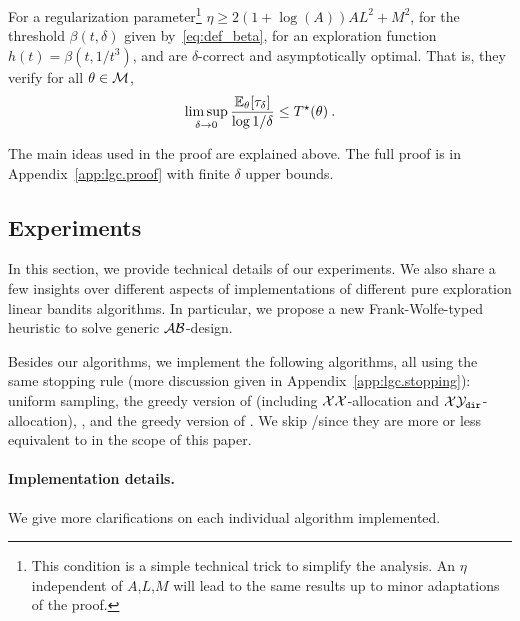 \begin{theorem}\label{thm:sample_complexity}
For a regularization parameter\footnote{This condition is a simple technical trick to simplify the analysis. An $\eta$ independent of $A$,$L$,$M$ will lead to the same results up to minor adaptations of the proof.} $\eta \geq 2(1+\log(A))AL^2+M^2$, for the threshold $\beta(t,\delta)$ given by~\eqref{eq:def_beta}, for an exploration function $h(t)=\beta(t,1/t^3)$, \LG and \LGC are $\delta$-correct and asymptotically optimal. That is, they verify for all $\theta\in \mathcal{M}$,
\begin{align*}
\limsup_{\delta\to 0}\frac{\mathbb{E}_\theta[\tau_\delta]}{ \log 1/\delta} \le T^{\star}(\theta) \: .
\end{align*}
\end{theorem}
The main ideas used in the proof are explained above. The full proof is in Appendix~\ref{app:lgc.proof} with finite $\delta$ upper bounds.

\subsection{Experiments}\label{sec:lgc.game.experiments}

In this section, we provide technical details of our experiments. We also share a few insights over different aspects of implementations of different pure exploration linear bandits algorithms. In particular, we propose a new Frank-Wolfe-typed heuristic to solve generic $\mathcal{A}\mathcal{B}$-design.

Besides our algorithms, we implement the following algorithms, all using the same stopping rule (more discussion given in Appendix~\ref{app:lgc.stopping}): uniform sampling, the greedy version of \XYS (including $\mathcal{X}\mathcal{X}$-allocation and $\mathcal{X}\mathcal{Y}_{\texttt{dir}}$-allocation), \XYA, and the greedy version of \LGapE. We skip \GLUCB/\GLGapE since they are more or less equivalent to \LGapE in the scope of this paper.

\paragraph{Implementation details.}
We give more clarifications on each individual algorithm implemented.


